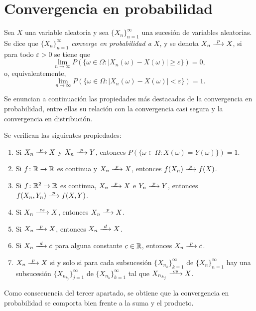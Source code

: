 \documentclass[a4paper, 11pt, extrafontsizes]{memoir}
\begin{document}
\section{Convergencia en probabilidad}

\begin{definition}
    Sea $X$ una variable aleatoria y sea $\{X_n\}_{n=1}^\infty$ una sucesión de variables aleatorias. Se dice que $\{X_n\}_{n=1}^\infty$ \emph{converge en probabilidad a $X$}, y se denota $X_n \pconv X$, si para todo $\varepsilon > 0$ se tiene que
    \[\lim_{n \to \infty} P\left(\{\omega \in \Omega \colon |X_n(\omega) - X(\omega)| \geq \varepsilon\}\right) = 0, \]
    o, equivalentemente,
    \[\lim_{n \to \infty} P\left(\{\omega \in \Omega \colon |X_n(\omega) - X(\omega)| < \varepsilon\}\right) = 1. \]
\end{definition}

Se enuncian a continuación las propiedades más destacadas de la convergencia en probabilidad, entre ellas su relación con la convergencia casi segura y la convergencia en distribución.

\begin{proposition}
    Se verifican las siguientes propiedades:
    \begin{enumerate}
        \item Si $X_n \pconv X$ y $X_n \pconv Y$, entonces $P(\{\omega \in \Omega \colon X(\omega) = Y(\omega)\}) = 1$.
        \item Si $f \colon \mathbb R \to \mathbb R$ es continua y $X_n \pconv X$, entonces $f(X_n) \pconv f(X)$.
        \item Si $f \colon \mathbb R^2 \to \mathbb R$ es continua, $X_n \pconv X$ e $Y_n \pconv Y$, entonces $f(X_n,Y_n) \pconv f(X,Y)$.
        \item Si $X_n \csconv X$, entonces $X_n \pconv X$.
        \item Si $X_n \pconv X$, entonces $X_n \dconv X$.
        \item Si $X_n \dconv c$ para alguna constante $c \in \mathbb R$, entonces $X_n \pconv c$.
        \item $X_n \pconv X$ si y solo si para cada subsucesión $\{X_{n_k}\}_{k=1}^\infty$ de $\{X_n\}_{n=1}^\infty$ hay una subsucesión $\{X_{n_{k_j}}\}_{j=1}^\infty$ de $\{X_{n_k}\}_{k=1}^\infty$ tal que $X_{n_{k_j}} \csconv X$.
    \end{enumerate}
\end{proposition}

Como consecuencia del tercer apartado, se obtiene que la convergencia en probabilidad se comporta bien frente a la suma y el producto.
\end{document}
